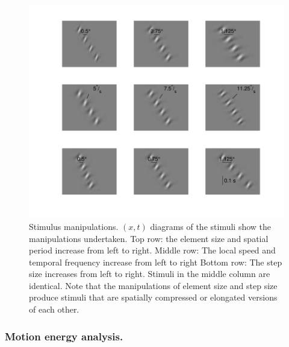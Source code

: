 \documentclass[../manuscript]{subfiles}
\begin{document}
\begin{figure}
  \begin{center}
    \includegraphics[width=.75\linewidth]{../grid_figure.pdf}
    \end{center}
    \caption{Stimulus manipulations. $(x,t)$ diagrams of the
      stimuli show the manipulations undertaken. Top row: the element
      size and spatial period increase from left to right. Middle row:
      The local speed and temporal frequency increase from left to
      right Bottom row: The step size increases from left
    to right. Stimuli in the middle column are identical. Note that
    the manipulations of element size and step size produce stimuli
    that are spatially compressed or elongated versions of each other.}
    \label{fig:grid-tableaux}
\end{figure}

\subsubsection{Motion energy analysis.}
\label{sec:grid-motion-energy-methods}
\end{document}
